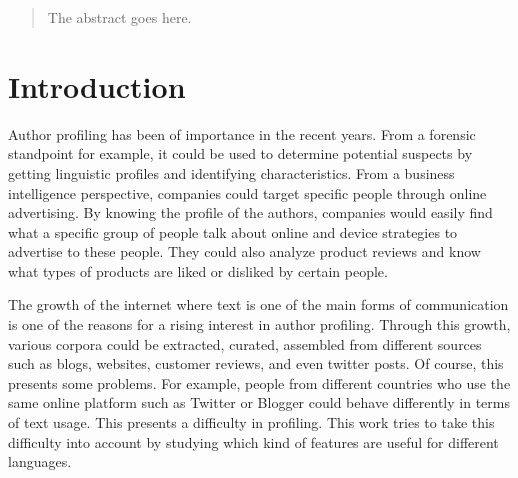 \documentclass[conference]{IEEEtran}
\begin{document}




\maketitle

\begin{abstract}
The abstract goes here.
\end{abstract}





%
\IEEEpeerreviewmaketitle



\section{Introduction}
Author profiling has been of importance in the recent years. From a forensic standpoint for example, it could be used to determine potential suspects by getting linguistic profiles and identifying characteristics. From a business intelligence perspective, companies could target specific people through online advertising. By knowing the profile of the authors, companies would easily find what a specific group of people talk about online and device strategies to advertise to these people. They could also analyze product reviews and know what types of products are liked or disliked by certain people. 

The growth of the internet where text is one of the main forms of communication is one of the reasons for a rising interest in author profiling. Through this growth, various corpora could be extracted, curated, assembled from different sources such as blogs, websites, customer reviews, and even twitter posts. Of course, this presents some problems. For example, people from different countries who use the same online platform such as Twitter or Blogger could behave differently in terms of text usage. This presents a difficulty in profiling. This work tries to take this difficulty into account by studying which kind of features are useful for different languages. 
\end{document}
